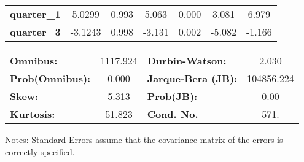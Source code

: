 \begin{center}
\begin{tabular}{lcccccc}
\textbf{quarter\_1}             &       5.0299  &        0.993     &     5.063  &         0.000        &        3.081    &        6.979     \\
\textbf{quarter\_3}             &      -3.1243  &        0.998     &    -3.131  &         0.002        &       -5.082    &       -1.166     \\
\bottomrule
\end{tabular}
\begin{tabular}{lclc}
\textbf{Omnibus:}       & 1117.924 & \textbf{  Durbin-Watson:     } &     2.030   \\
\textbf{Prob(Omnibus):} &   0.000  & \textbf{  Jarque-Bera (JB):  } & 104856.224  \\
\textbf{Skew:}          &   5.313  & \textbf{  Prob(JB):          } &      0.00   \\
\textbf{Kurtosis:}      &  51.823  & \textbf{  Cond. No.          } &      571.   \\
\bottomrule
\end{tabular}
\end{center}

Notes: \newline
 [1] Standard Errors assume that the covariance matrix of the errors is correctly specified.